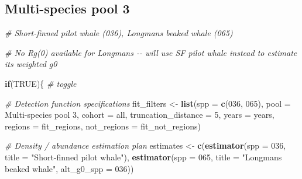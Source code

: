 \documentclass[
]{book}
\newenvironment{Shaded}{\begin{snugshade}}{\end{snugshade}}
\newcommand{\AttributeTok}[1]{\textcolor[rgb]{0.13,0.29,0.53}{#1}}
\newcommand{\CommentTok}[1]{\textcolor[rgb]{0.56,0.35,0.01}{\textit{#1}}}
\newcommand{\ConstantTok}[1]{\textcolor[rgb]{0.56,0.35,0.01}{#1}}
\newcommand{\ControlFlowTok}[1]{\textcolor[rgb]{0.13,0.29,0.53}{\textbf{#1}}}
\newcommand{\DecValTok}[1]{\textcolor[rgb]{0.00,0.00,0.81}{#1}}
\newcommand{\FunctionTok}[1]{\textcolor[rgb]{0.13,0.29,0.53}{\textbf{#1}}}
\newcommand{\NormalTok}[1]{#1}
\newcommand{\OtherTok}[1]{\textcolor[rgb]{0.56,0.35,0.01}{#1}}
\newcommand{\StringTok}[1]{\textcolor[rgb]{0.31,0.60,0.02}{#1}}
\begin{document}
\hypertarget{multi-species-pool-3}{%
\subsection*{Multi-species pool 3}\label{multi-species-pool-3}}

\begin{Shaded}
\begin{Highlighting}[]
\CommentTok{\# Short{-}finned pilot whale (036), Longman\textquotesingle{}s beaked whale (065)}

\CommentTok{\# No Rg(0) available for Longman\textquotesingle{}s {-}{-} will use SF pilot whale instead to estimate its weighted g0}

\ControlFlowTok{if}\NormalTok{(}\ConstantTok{TRUE}\NormalTok{)\{ }\CommentTok{\# toggle}

  \CommentTok{\# Detection function specifications}
\NormalTok{  fit\_filters }\OtherTok{\textless{}{-}}
    \FunctionTok{list}\NormalTok{(}\AttributeTok{spp =} \FunctionTok{c}\NormalTok{(}\StringTok{\textquotesingle{}036\textquotesingle{}}\NormalTok{, }\StringTok{\textquotesingle{}065\textquotesingle{}}\NormalTok{),}
         \AttributeTok{pool =} \StringTok{\textquotesingle{}Multi{-}species pool 3\textquotesingle{}}\NormalTok{,}
         \AttributeTok{cohort =} \StringTok{\textquotesingle{}all\textquotesingle{}}\NormalTok{,}
         \AttributeTok{truncation\_distance =} \DecValTok{5}\NormalTok{,}
         \AttributeTok{years =}\NormalTok{ years,}
         \AttributeTok{regions =}\NormalTok{ fit\_regions,}
         \AttributeTok{not\_regions =}\NormalTok{ fit\_not\_regions)}

  \CommentTok{\# Density / abundance estimation plan}
\NormalTok{  estimates }\OtherTok{\textless{}{-}}
    \FunctionTok{c}\NormalTok{(}\FunctionTok{estimator}\NormalTok{(}\AttributeTok{spp =} \StringTok{\textquotesingle{}036\textquotesingle{}}\NormalTok{, }\AttributeTok{title =} \StringTok{"Short{-}finned pilot whale"}\NormalTok{),}
      \FunctionTok{estimator}\NormalTok{(}\AttributeTok{spp =} \StringTok{\textquotesingle{}065\textquotesingle{}}\NormalTok{, }\AttributeTok{title =} \StringTok{"Longman\textquotesingle{}s beaked whale"}\NormalTok{, }
                \AttributeTok{alt\_g0\_spp =} \StringTok{\textquotesingle{}036\textquotesingle{}}\NormalTok{))}


\end{Highlighting}
\end{Shaded}
\end{document}
